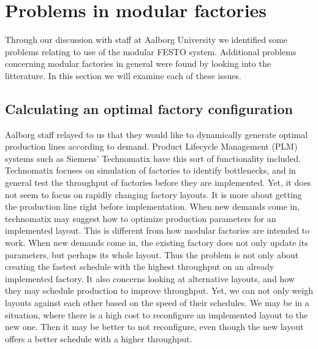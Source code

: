 \section{Problems in modular factories}
Through our discussion with staff at Aalborg University we identified some problems relating to use of the modular FESTO system. Additional problems concerning modular factories in general were found by looking into the litterature. In this section we will examine each of these issues. 

\subsection{Calculating an optimal factory configuration}
Aalborg staff relayed to us that they would like to dynamically generate optimal production lines according to demand. Product Lifecycle Management (PLM) systems such as Siemens' Technomatix \cite{Siemens2014} have this sort of functionality included. Technomatix focuses on simulation of factories to identify bottlenecks, and in general test the throughput of factories before they are implemented. Yet, it does not seem to focus on rapidly changing factory layouts. It is more about getting the production line right before implementation. When new demands come in, technomatix may suggest how to optimize production parameters for an implemented layout. This is different from how modular factories are intended to work. When new demands come in, the existing factory does not only update its parameters, but perhaps its whole layout. Thus the problem is not only about creating the fastest schedule with the highest throughput on an already implemented factory. It also concerns looking at alternative layouts, and how they may schedule production to improve throughput. Yet, we can not only weigh layouts against each other based on the speed of their schedules. We may be in a situation, where there is a high cost to reconfigure an implemented layout to the new one. Then it may be better to not reconfigure, even though the new layout offers a better schedule with a higher throughput. 


